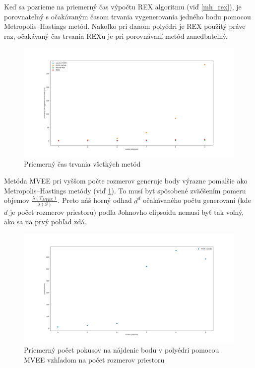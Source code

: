 Keď sa pozrieme na priemerný čas výpočtu REX algoritmu (viď \ref{mh_rex}), je porovnateľný s očakávaným časom trvania vygenerovania jedného bodu pomocou Metropolis--Hastings metód. Nakoľko pri danom polyédri je REX použitý práve raz, očakávaný čas trvania REXu je pri porovnávaní metód zanedbateľný.\\

\begin{figure} 
  \includegraphics[width=\linewidth]{images/vsetky.png}
  \caption{Priemerný čas trvania všetkých metód}
  \label{fig:vsetky}
\end{figure}

Metóda MVEE pri vyššom počte rozmerov generuje body výrazne pomalšie ako Metropolis--Hastings metódy (viď \ref{fig:vsetky}).
To musí byť spôsobené zväčšením pomeru objemov $\frac{\lambda(T_{MVEE})}{\lambda(S)}$. Preto náš horný odhad $d^d$ očakávaného počtu generovaní (kde $d$ je počet rozmerov priestoru) podľa Johnovho elipsoidu nemusí byť tak voľný, ako sa na prvý pohľad zdá.\\

\begin{figure} 
	\includegraphics[width=\linewidth]{images/mvee_pokusy.png}
	\caption{Priemerný počet pokusov na nájdenie bodu v polyédri pomocou MVEE vzhľadom na počet rozmerov priestoru}
	\label{fig:mvee_pokusy}
\end{figure}

